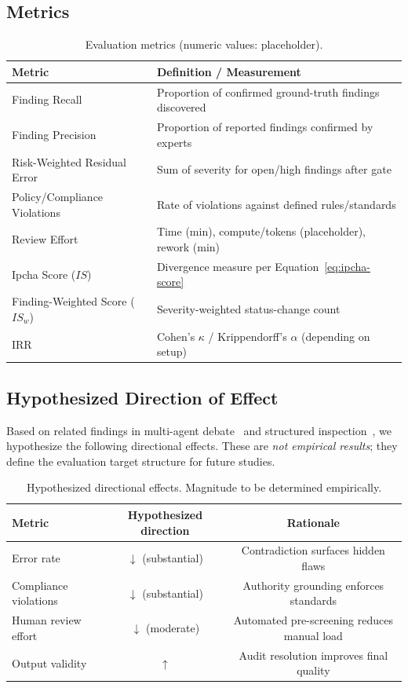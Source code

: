 \documentclass[11pt,a4paper]{article}
\begin{document}
\subsection{Metrics}
\begin{table}[h]
\centering
\begin{tabular}{@{}ll@{}}
\toprule
Metric & Definition / Measurement \\ \midrule
Finding Recall & Proportion of confirmed ground-truth findings discovered \\
Finding Precision & Proportion of reported findings confirmed by experts \\
Risk-Weighted Residual Error & Sum of severity for open/high findings after gate \\
Policy/Compliance Violations & Rate of violations against defined rules/standards \\
Review Effort & Time (min), compute/tokens (placeholder), rework (min) \\
Ipcha Score ($\mathit{IS}$) & Divergence measure per Equation~\ref{eq:ipcha-score} \\
Finding-Weighted Score ($\mathit{IS}_w$) & Severity-weighted status-change count \\
IRR & Cohen's $\kappa$ / Krippendorff's $\alpha$ (depending on setup) \\ \bottomrule
\end{tabular}
\caption{Evaluation metrics (numeric values: placeholder).}
\end{table}

\subsection{Hypothesized Direction of Effect}
Based on related findings in multi-agent debate~\cite{du_multiagent_debate} and structured inspection~\cite{fagan1976}, we hypothesize the following directional effects.
These are \emph{not empirical results}; they define the evaluation target structure for future studies.

\begin{table}[h]
\centering
\small
\begin{tabular}{lcc}
\toprule
Metric & Hypothesized direction & Rationale \\
\midrule
Error rate & $\downarrow$ (substantial) & Contradiction surfaces hidden flaws \\
Compliance violations & $\downarrow$ (substantial) & Authority grounding enforces standards \\
Human review effort & $\downarrow$ (moderate) & Automated pre-screening reduces manual load \\
Output validity & $\uparrow$ & Audit resolution improves final quality \\
\bottomrule
\end{tabular}
\caption{Hypothesized directional effects. Magnitude to be determined empirically.}
\label{tab:hypotheses}
\end{table}
\end{document}
